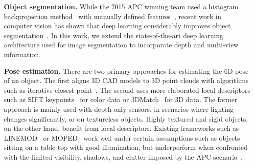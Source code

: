 \documentclass[letterpaper, 10 pt, conference]{ieeeconf}  %
\newcommand{\myparagraph}[1]{\vspace{0.1in}\noindent\textbf{#1}}
\DeclareRobustCommand{\pynote}[1]{\ifthenelse{\boolean{draft-mode}}{\textcolor{green}{\textbf{PY: #1}}}{}}
\begin{document}
\myparagraph{Object segmentation.}
While the 2015 APC winning team used a histogram backprojection method~\cite{Ming-Yu} with manually defined features~\cite{rbolessons, jonschkowski2016probabilistic}, recent work in computer vision has shown that deep learning considerably improves object segmentation~\cite{long2015fully}.
In this work, we extend the state-of-the-art deep learning architecture used for image segmentation to incorporate depth and multi-view information. 


\myparagraph{Pose estimation.}
There are two primary approaches for estimating the 6D pose of an object. The first aligns 3D CAD models to 3D point clouds
with algorithms such as iterative closest point~\cite{besl1992method}. 
%
The second uses more elaborated local descriptors such as SIFT keypoints~\cite{SIFT} for color data or 3DMatch~\cite{3dmatch} for 3D data.
%
The former approach is mainly used with depth-only sensors, in scenarios where lighting changes significantly, or on textureless objects. Highly textured and rigid objects, on the other hand, benefit from local descriptors. 
%
Existing frameworks such as LINEMOD~\cite{LINEMOD} or MOPED~\cite{collet2011moped} work well under certain assumptions such as objects sitting on a table top with good illumination, but underperform when confronted with the limited visibility, shadows, and clutter imposed by the APC scenario~\cite{Correll2016}.

% 


\end{document}
